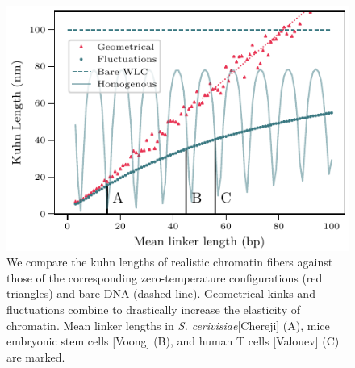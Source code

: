 \documentclass[%
 reprint,
superscriptaddress,
showpacs,preprintnumbers,
 amsmath,amssymb,
 aps,
 prl,
]{revtex4-1}
\begin{document}
\begin{figure}[t]
    \centering
    \label{fig:exp-kuhns}
        \includegraphics[width=0.95\linewidth]{./figures/fig3_kuhn_exponential.pdf}
    \caption{We compare the kuhn lengths of realistic chromatin fibers
    against those of the corresponding zero-temperature configurations (red
    triangles) and bare DNA (dashed line). Geometrical kinks and fluctuations
    combine to drastically increase the elasticity of chromatin. Mean linker
    lengths in \textit{S.  cerivisiae}[Chereji] (A), mice embryonic stem cells
    [Voong] (B), and human T cells  [Valouev] (C)  are marked.}
\end{figure}
\end{document}
